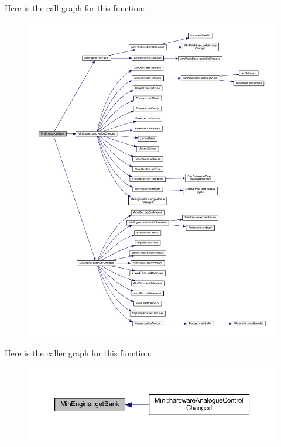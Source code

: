 Here is the call graph for this function\+:
\nopagebreak
\begin{figure}[H]
\begin{center}
\leavevmode
\includegraphics[width=350pt]{d4/d0f/class_min_engine_ae9224dca462d7a6233fb7c22210cc8a8_cgraph}
\end{center}
\end{figure}
Here is the caller graph for this function\+:
\nopagebreak
\begin{figure}[H]
\begin{center}
\leavevmode
\includegraphics[width=350pt]{d4/d0f/class_min_engine_ae9224dca462d7a6233fb7c22210cc8a8_icgraph}
\end{center}
\end{figure}
\mbox{\label{class_min_engine_a36831a348bb8157f2cc3a4720d92434e}} 
